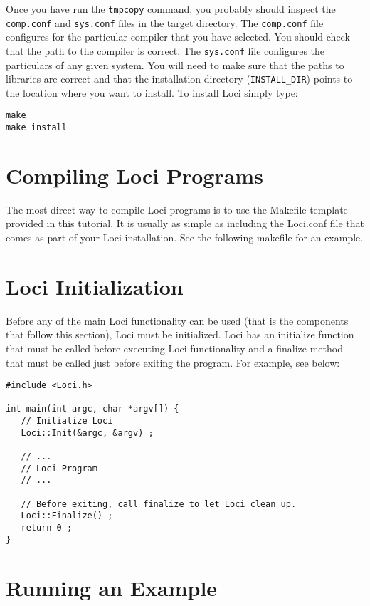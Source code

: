 \documentclass[10pt,epsf]{book}
\begin{document}
Once you have run the {\tt tmpcopy} command, you probably should
inspect the {\tt comp.conf} and {\tt sys.conf} files in the target directory.
The {\tt comp.conf} file configures for the particular compiler that you
have selected.  You should check that the path to the compiler is
correct.  The {\tt sys.conf} file configures the particulars of any
given system.  You will need to make sure that the paths to libraries
are correct and that the installation directory ({\tt INSTALL\_DIR})
points to the location where you want to install.  To install Loci
simply type:

\begin{verbatim}
make
make install
\end{verbatim}


\section{ Compiling Loci Programs }

The most direct way to compile Loci programs is to use the Makefile
template provided in this tutorial.  It is usually as simple as
including the Loci.conf file that comes as part of your Loci
installation.  See the following makefile for an example.



\section{Loci Initialization}

Before any of the main Loci functionality can be used (that is the
components that follow this section), Loci must be initialized.  Loci
has an initialize function that must be called before executing Loci
functionality and a finalize method that must be called just before
exiting the program.  For example, see below:

\begin{verbatim}
#include <Loci.h>

int main(int argc, char *argv[]) {
   // Initialize Loci
   Loci::Init(&argc, &argv) ;

   // ...
   // Loci Program
   // ...

   // Before exiting, call finalize to let Loci clean up.
   Loci::Finalize() ;
   return 0 ;
}
\end{verbatim}



\section{Running an Example}
\end{document}
